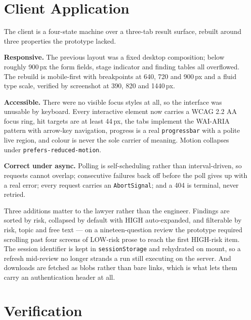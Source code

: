 \documentclass[11pt,a4paper]{article}
\newcommand{\code}[1]{\texttt{\small #1}}
\begin{document}
\section{Client Application}

The client is a four-state machine over a three-tab result surface, rebuilt around three
properties the prototype lacked.

\textbf{Responsive.} The previous layout was a fixed desktop composition; below roughly
900\,px the form fields, stage indicator and finding tables all overflowed. The rebuild is
mobile-first with breakpoints at 640, 720 and 900\,px and a fluid type scale, verified by
screenshot at 390, 820 and 1440\,px.

\textbf{Accessible.} There were no visible focus styles at all, so the interface was
unusable by keyboard. Every interactive element now carries a WCAG 2.2 AA focus ring, hit
targets are at least 44\,px, the tabs implement the WAI-ARIA pattern with arrow-key
navigation, progress is a real \code{progressbar} with a polite live region, and colour is
never the sole carrier of meaning. Motion collapses under \code{prefers-reduced-motion}.

\textbf{Correct under async.} Polling is self-scheduling rather than interval-driven, so
requests cannot overlap; consecutive failures back off before the poll gives up with a real
error; every request carries an \code{AbortSignal}; and a 404 is terminal, never retried.

Three additions matter to the lawyer rather than the engineer. Findings are sorted by risk,
collapsed by default with HIGH auto-expanded, and filterable by risk, topic and free text
--- on a nineteen-question review the prototype required scrolling past four screens of
LOW-risk prose to reach the first HIGH-risk item. The session identifier is kept in
\code{sessionStorage} and rehydrated on mount, so a refresh mid-review no longer strands a
run still executing on the server. And downloads are fetched as blobs rather than bare
links, which is what lets them carry an authentication header at all.

\section{Verification}
\label{sec:verification}
\end{document}
